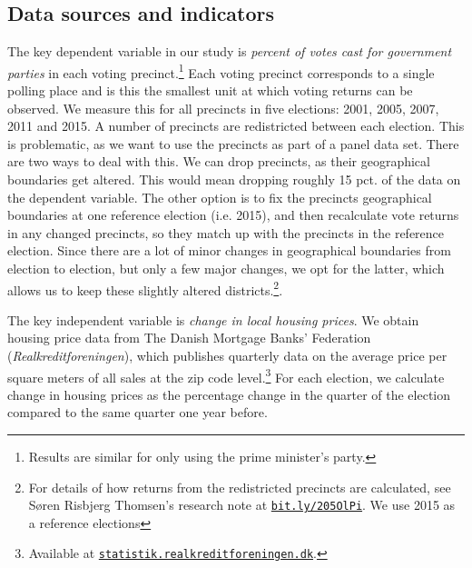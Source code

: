 \documentclass[12pt,a4paper]{article}
\begin{document}
\subsection{Data sources and indicators}
The key dependent variable in our study is \textit{percent of votes cast for government parties} in each voting precinct.\footnote{Results are similar for only using the prime minister's party.} Each voting precinct corresponds to a single polling place and is this the smallest unit at which voting returns can be observed. We measure this for all precincts in five elections: 2001, 2005, 2007, 2011 and 2015. A number of precincts are redistricted between each election. This is problematic, as we want to use  the precincts as part of a panel data set. There are two ways to deal with this. We can drop precincts, as their geographical boundaries get altered. This would mean dropping roughly 15 pct. of the data on the dependent variable. The other option is to fix the precincts geographical boundaries at one reference election (i.e. 2015), and then recalculate vote returns in any changed precincts, so they match up with the precincts in the reference election. Since there are a lot of minor changes in geographical boundaries from election to election, but only a few major changes, we opt for the latter, which allows us to keep these slightly  altered districts.\footnote{For details of how returns from the redistricted precincts are calculated, see Søren Risbjerg Thomsen's research note at \texttt{\href{http://bit.ly/205OlPi}{bit.ly/205OlPi}}.  We use 2015 as a reference elections}. 

The key independent variable is \textit{change in local housing prices}. We obtain housing price data from The Danish Mortgage Banks' Federation (\textit{Realkreditforeningen}), which publishes quarterly data on the average price per square meters of all sales at the zip code level.\footnote{Available at \texttt{\href{http://statistik.realkreditforeningen.dk/}{statistik.realkreditforeningen.dk}}.} For each election, we calculate change in housing prices as the percentage change in the quarter of the election compared to the same quarter one year before. 
\end{document}
